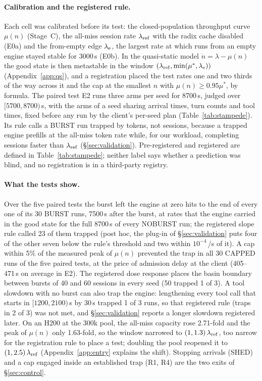 \paragraph{Calibration and the registered rule.} Each cell was calibrated before its test: the closed-population throughput curve
$\mu(n)$ (Stage~C), the all-miss session rate $\lambda_{\mathrm{ref}}$ with the radix cache disabled (E0a) and the from-empty edge $\lambda_{\mathrm{e}}$, the largest
rate at which runs from an empty engine stayed stable for 3000\,s (E0b). In the quasi-static model $\dot n=\lambda-\mu(n)$ the good
state is then metastable in the window $(\lambda_{\mathrm{ref}},\min(\mu^*,\lambda_{\mathrm{e}}))$ (Appendix~\ref{app:qs}), and a registration placed the test rates
one and two thirds of the way across it and the cap at the smallest $n$ with $\mu(n)\ge0.95\mu^*$, by formula. The paired test E2
runs three arms per seed for 8700\,s, judged over $[5700,8700)$\,s, with the arms of a seed sharing arrival times, turn counts and
tool times, fixed before any run by the client's per-seed plan (Table~\ref{tab:stampede}). Its rule calls a BURST run trapped by tokens, not sessions, because a trapped engine prefills
at the all-miss token rate while, for our workload, completing sessions faster than $\lambda_{\mathrm{ref}}$ (\S\ref{sec:validation}). Pre-registered and registered are defined in
Table~\ref{tab:stampede}; neither label says whether a prediction was blind, and no registration is in a third-party registry.

\paragraph{What the tests show.} Over the five paired tests the burst left the engine at zero hits to the end of every one of its
30 BURST runs, 7500\,s after the burst, at rates that the engine carried in the good state for the full 8700\,s of every NOBURST
run; the registered slope rule called 23 of them trapped (post hoc, the plug-in of \S\ref{sec:validation} puts four of the other seven
below the rule's threshold and two within $10^{-4}$\,/s of it). A cap within 5\% of
the measured peak of $\mu(n)$ prevented the trap in all 30 CAPPED runs of the five paired tests, at the price of admission delay at
the client (405--471\,s on average in E2). The registered dose response places the basin boundary between
bursts of 40 and 60 sessions in every seed (50 trapped 1 of 3). A tool slowdown with no burst can also trap the engine: lengthening
every tool call that starts in $[1200,2100)$\,s by 30\,s trapped 1 of 3 runs, so that registered rule (traps in 2 of 3) was not met,
and \S\ref{sec:validation} reports a longer slowdown registered later. On an H200 at the 300k pool, the all-miss capacity rose
2.71-fold and the peak of $\mu(n)$ only 1.63-fold, so the window narrowed to $(1,1.3)\,\lambda_{\mathrm{ref}}$, too narrow for the registration rule
to place a test; doubling the pool reopened it to $(1,2.5)\,\lambda_{\mathrm{ref}}$ (Appendix~\ref{app:entry} explains the shift). Stopping
arrivals (SHED) and a cap engaged inside an established trap (R1, R4) are the two exits of \S\ref{sec:control}.

